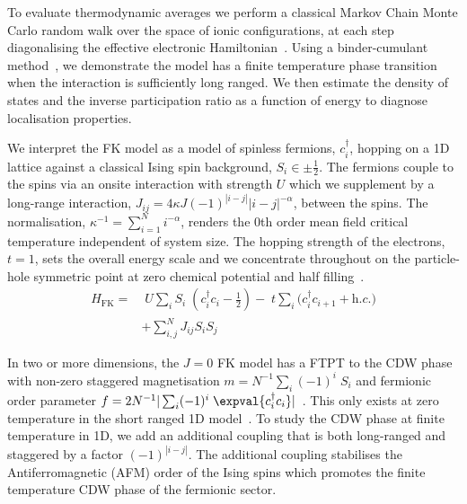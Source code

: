 To evaluate thermodynamic averages we perform a classical Markov Chain Monte Carlo random walk over the space of ionic configurations, at each step diagonalising the effective electronic Hamiltonian~\autocite{maskaThermodynamicsTwodimensionalFalicovKimball2006}. Using a binder-cumulant method~\autocite{binderFiniteSizeScaling1981,musialMonteCarloSimulations2002}, we demonstrate the model has a finite temperature phase transition when the interaction is sufficiently long ranged. We then estimate the density of states and the inverse participation ratio as a function of energy to diagnose localisation properties.

We interpret the FK model as a model of spinless fermions, \(c^\dagger_{i}\), hopping on a 1D lattice against a classical Ising spin background, \(S_i \in {\pm \frac{1}{2}}\). The fermions couple to the spins via an onsite interaction with strength \(U\) which we supplement by a long-range interaction, \(J_{ij} = 4\kappa J (-1)^{|i-j|} |i-j|^{-\alpha}\), between the spins. The normalisation, \(\kappa^{-1} = \sum_{i=1}^{N} i^{-\alpha}\), renders the 0th order mean field critical temperature independent of system size. The hopping strength of the electrons, \(t = 1\), sets the overall energy scale and we concentrate throughout on the particle-hole symmetric point at zero chemical potential and half filling~\autocite{gruberFalicovKimballModelReview1996}. ~ \[\begin{aligned}
H_{\mathrm{FK}} = & \;U \sum_{i} S_i\;(c^\dagger_{i}c_{i} - \tfrac{1}{2}) -\;t \sum_{i} (c^\dagger_{i}c_{i+1} + \textit{h.c.)}\\ 
 &  + \sum_{i, j}^{N} J_{ij}  S_i S_j \nonumber
\label{eq:HFK}\end{aligned}\]

In two or more dimensions, the \(J\!=0\!\) FK model has a FTPT to the CDW phase with non-zero staggered magnetisation \(m = N^{-1} \sum_i (-1)^i \; S_i\) and fermionic order parameter \(f = 2 N^{-1}|\sum_i (-1)^i \; \expval{c^\dagger_{i}c_{i}}|\)~\autocite{antipovInteractionTunedAndersonMott2016,maskaThermodynamicsTwodimensionalFalicovKimball2006}. This only exists at zero temperature in the short ranged 1D model~\autocite{kennedyItinerantElectronModel1986}. To study the CDW phase at finite temperature in 1D, we add an additional coupling that is both long-ranged and staggered by a factor \((-1)^{|i-j|}\). The additional coupling stabilises the Antiferromagnetic (AFM) order of the Ising spins which promotes the finite temperature CDW phase of the fermionic sector.

